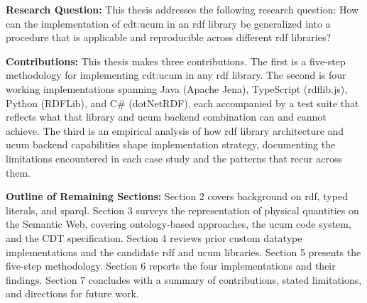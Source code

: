 \textbf{Research Question:} This thesis addresses the following research question: 
How can the implementation of cdt:ucum in an \ac{rdf} library be generalized into a procedure that is applicable and reproducible across different \ac{rdf} libraries?

\textbf{Contributions:} This thesis makes three contributions. The first is a five-step methodology for implementing cdt:ucum in any \ac{rdf} library. The second is four working implementations spanning Java (Apache Jena), TypeScript (rdflib.js), Python (RDFLib), and C\# (dotNetRDF), each accompanied by a test suite that reflects what that library and \ac{ucum} backend combination can and cannot achieve. The third is an empirical analysis of how \ac{rdf} library architecture and \ac{ucum} backend capabilities shape implementation strategy, documenting the limitations encountered in each case study and the patterns that recur across them.


\textbf{Outline of Remaining Sections:}
Section 2 covers background on \ac{rdf}, typed literals, and \ac{sparql}. Section 3 surveys the representation of physical quantities on the Semantic Web, covering ontology-based approaches, the \ac{ucum} code system, and the CDT specification. Section 4 reviews prior custom datatype implementations and the candidate \ac{rdf} and \ac{ucum} libraries. Section 5 presents the five-step methodology. Section 6 reports the four implementations and their findings. Section 7 concludes with a summary of contributions, stated limitations, and directions for future work.